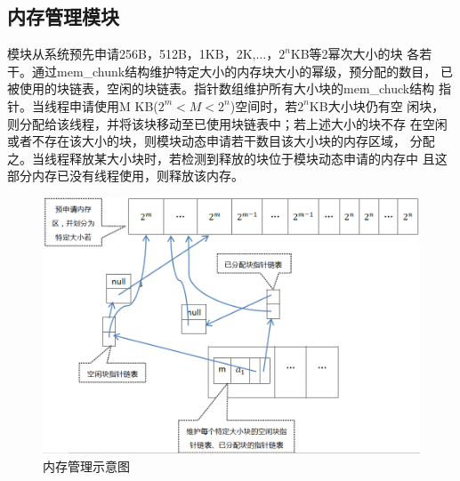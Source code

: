 
%
\subsection{内存管理模块}
		模块从系统预先申请256B，512B，1KB，2K,$\ldots$，$2^n$KB等2幂次大小的块
		各若干。通过mem\_chunk结构维护特定大小的内存块大小的幂级，预分配的数目，
		已被使用的块链表，空闲的块链表。指针数组维护所有大小块的mem\_chuck结构
		指针。当线程申请使用M KB($2^m < M < 2^n$)空间时，若$2^n$KB大小块仍有空
		闲块，则分配给该线程，并将该块移动至已使用块链表中；若上述大小的块不存
		在空闲或者不存在该大小的块，则模块动态申请若干数目该大小块的内存区域，
		分配之。当线程释放某大小块时，若检测到释放的块位于模块动态申请的内存中
		且这部分内存已没有线程使用，则释放该内存。
\begin{figure}[H]
\centering
\includegraphics[keepaspectratio,scale=0.5]{pitures/mm.png}
\caption{内存管理示意图}
\end{figure}

